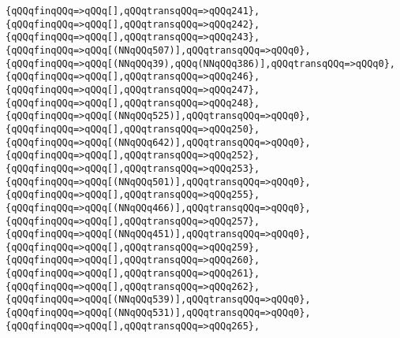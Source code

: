 \verb|{qQQqfinqQQq=>qQQq[],qQQqtransqQQq=>qQQq241},|\newline
\verb|{qQQqfinqQQq=>qQQq[],qQQqtransqQQq=>qQQq242},|\newline
\verb|{qQQqfinqQQq=>qQQq[],qQQqtransqQQq=>qQQq243},|\newline
\verb|{qQQqfinqQQq=>qQQq[(NNqQQq507)],qQQqtransqQQq=>qQQq0},|\newline
\verb|{qQQqfinqQQq=>qQQq[(NNqQQq39),qQQq(NNqQQq386)],qQQqtransqQQq=>qQQq0},|\newline
\verb|{qQQqfinqQQq=>qQQq[],qQQqtransqQQq=>qQQq246},|\newline
\verb|{qQQqfinqQQq=>qQQq[],qQQqtransqQQq=>qQQq247},|\newline
\verb|{qQQqfinqQQq=>qQQq[],qQQqtransqQQq=>qQQq248},|\newline
\verb|{qQQqfinqQQq=>qQQq[(NNqQQq525)],qQQqtransqQQq=>qQQq0},|\newline
\verb|{qQQqfinqQQq=>qQQq[],qQQqtransqQQq=>qQQq250},|\newline
\verb|{qQQqfinqQQq=>qQQq[(NNqQQq642)],qQQqtransqQQq=>qQQq0},|\newline
\verb|{qQQqfinqQQq=>qQQq[],qQQqtransqQQq=>qQQq252},|\newline
\verb|{qQQqfinqQQq=>qQQq[],qQQqtransqQQq=>qQQq253},|\newline
\verb|{qQQqfinqQQq=>qQQq[(NNqQQq501)],qQQqtransqQQq=>qQQq0},|\newline
\verb|{qQQqfinqQQq=>qQQq[],qQQqtransqQQq=>qQQq255},|\newline
\verb|{qQQqfinqQQq=>qQQq[(NNqQQq466)],qQQqtransqQQq=>qQQq0},|\newline
\verb|{qQQqfinqQQq=>qQQq[],qQQqtransqQQq=>qQQq257},|\newline
\verb|{qQQqfinqQQq=>qQQq[(NNqQQq451)],qQQqtransqQQq=>qQQq0},|\newline
\verb|{qQQqfinqQQq=>qQQq[],qQQqtransqQQq=>qQQq259},|\newline
\verb|{qQQqfinqQQq=>qQQq[],qQQqtransqQQq=>qQQq260},|\newline
\verb|{qQQqfinqQQq=>qQQq[],qQQqtransqQQq=>qQQq261},|\newline
\verb|{qQQqfinqQQq=>qQQq[],qQQqtransqQQq=>qQQq262},|\newline
\verb|{qQQqfinqQQq=>qQQq[(NNqQQq539)],qQQqtransqQQq=>qQQq0},|\newline
\verb|{qQQqfinqQQq=>qQQq[(NNqQQq531)],qQQqtransqQQq=>qQQq0},|\newline
\verb|{qQQqfinqQQq=>qQQq[],qQQqtransqQQq=>qQQq265},|\newline
